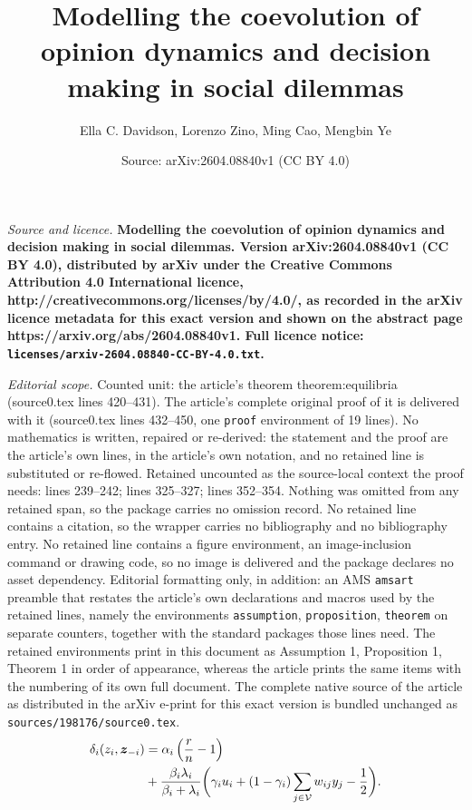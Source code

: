 \documentclass[10pt,a4paper]{amsart}
\title{\LARGE \bf Modelling the coevolution of opinion dynamics and decision making in social dilemmas}
\author{Ella C. Davidson, Lorenzo Zino, Ming Cao, Mengbin Ye}
\date{Source: arXiv:2604.08840v1 (CC BY 4.0)}
\newcommand{\vect}[1]{\boldsymbol{#1}}
\begin{document}
\maketitle

\noindent\emph{Source and licence.} \LARGE \bf Modelling the coevolution of opinion dynamics and decision making in social dilemmas. Version arXiv:2604.08840v1 (CC BY 4.0), distributed by arXiv under the Creative Commons Attribution 4.0 International licence, http://creativecommons.org/licenses/by/4.0/, as recorded in the arXiv licence metadata for this exact version and shown on the abstract page https://arxiv.org/abs/2604.08840v1. Full licence notice: \texttt{licenses/arxiv-2604.08840-CC-BY-4.0.txt}.\par\smallskip

\noindent\textit{Editorial scope.} Counted unit: the article's theorem theorem:equilibria (source0.tex lines 420--431). The article's complete original proof of it is delivered with it (source0.tex lines 432--450, one \texttt{proof} environment of 19 lines). No mathematics is written, repaired or re-derived: the statement and the proof are the article's own lines, in the article's own notation, and no retained line is substituted or re-flowed.  Retained uncounted as the source-local context the proof needs: lines 239--242; lines 325--327; lines 352--354.  Nothing was omitted from any retained span, so the package carries no omission record.  No retained line contains a citation, so the wrapper carries no bibliography and no bibliography entry.  No retained line contains a figure environment, an image-inclusion command or drawing code, so no image is delivered and the package declares no asset dependency.  Editorial formatting only, in addition: an AMS \texttt{amsart} preamble that restates the article's own declarations and macros used by the retained lines, namely the environments \texttt{assumption}, \texttt{proposition}, \texttt{theorem} on separate counters, together with the standard packages those lines need.  The retained environments print in this document as Assumption 1, Proposition 1, Theorem 1 in order of appearance, whereas the article prints the same items with the numbering of its own full document.  The complete native source of the article as distributed in the arXiv e-print for this exact version is bundled unchanged as \texttt{sources/198176/source0.tex}.
\begin{align}\label{eq:discriminant}
    \delta_i(z_i,\vect{z}_{-i}) &=  \alpha_i\left( \dfrac{r}{n}-1 \right) \\ \notag
    &+ \frac{\beta_i\lambda_i}{\beta_i+\lambda_i}\bigg(\gamma_iu_i+(1-\gamma_i)\sum_{j\in\mathcal{V}}w_{ij}y_j-\frac{1}{2}\bigg).
\end{align} 
\end{document}
